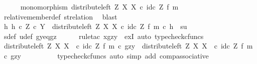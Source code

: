 \begin{isabellebody}
\ \ \ \ \isamarkupfalse%
\ {\isachardoublequoteopen}monomorphism\ {\isacharparenleft}{\kern0pt}distribute{\isacharunderscore}{\kern0pt}left\ Z\ X\ X\ {\isasymcirc}\isactrlsub c\ id\isactrlsub c\ Z\ {\isasymtimes}\isactrlsub f\ m{\isacharparenright}{\kern0pt}{\isachardoublequoteclose}\isanewline
\ \ \ \ \ \ \isamarkupfalse%
\ relative{\isacharunderscore}{\kern0pt}member{\isacharunderscore}{\kern0pt}def{}\ st{\isacharunderscore}{\kern0pt}relation\ \isamarkupfalse%
\ blast\isanewline
\ \ \ \ \isamarkupfalse%
\ {\isachardoublequoteopen}{\isasymexists}h{\isachardot}{\kern0pt}\ h\ {\isasymin}\isactrlsub c\ Z\ {\isasymtimes}\isactrlsub c\ Y\ {\isasymand}\ {\isacharparenleft}{\kern0pt}distribute{\isacharunderscore}{\kern0pt}left\ Z\ X\ X\ {\isasymcirc}\isactrlsub c\ id\isactrlsub c\ Z\ {\isasymtimes}\isactrlsub f\ m{\isacharparenright}{\kern0pt}\ {\isasymcirc}\isactrlsub c\ h\ {\isacharequal}{\kern0pt}\ {\isasymlangle}s{\isacharcomma}{\kern0pt}u{\isasymrangle}{\isachardoublequoteclose}\isanewline
\ \ \ \ \ \ \isamarkupfalse%
\ s{\isacharunderscore}{\kern0pt}def\ u{\isacharunderscore}{\kern0pt}def\ gy{\isacharunderscore}{\kern0pt}eq{\isacharunderscore}{\kern0pt}gz\isanewline
\ \ \ \ \isamarkupfalse%
\ {\isacharparenleft}{\kern0pt}rule{\isacharunderscore}{\kern0pt}tac\ x{\isacharequal}{\kern0pt}{\isachardoublequoteopen}{\isasymlangle}gz{\isacharcomma}{\kern0pt}y{\isasymrangle}{\isachardoublequoteclose}\ \ exI{\isacharcomma}{\kern0pt}\ auto{\isacharcomma}{\kern0pt}\ typecheck{\isacharunderscore}{\kern0pt}cfuncs{\isacharparenright}{\kern0pt}\isanewline
\ \ \ \ \ \ \isamarkupfalse%
\ {\isachardoublequoteopen}{\isacharparenleft}{\kern0pt}distribute{\isacharunderscore}{\kern0pt}left\ Z\ X\ X\ \ {\isasymcirc}\isactrlsub c\ {\isacharparenleft}{\kern0pt}id\isactrlsub c\ Z\ {\isasymtimes}\isactrlsub f\ m{\isacharparenright}{\kern0pt}{\isacharparenright}{\kern0pt}\ {\isasymcirc}\isactrlsub c\ {\isasymlangle}gz{\isacharcomma}{\kern0pt}y{\isasymrangle}\ {\isacharequal}{\kern0pt}\ distribute{\isacharunderscore}{\kern0pt}left\ Z\ X\ X\ \ {\isasymcirc}\isactrlsub c\ {\isacharparenleft}{\kern0pt}id\isactrlsub c\ Z\ {\isasymtimes}\isactrlsub f\ m{\isacharparenright}{\kern0pt}\ {\isasymcirc}\isactrlsub c\ {\isasymlangle}gz{\isacharcomma}{\kern0pt}y{\isasymrangle}{\isachardoublequoteclose}\isanewline
\ \ \ \ \ \ \ \ \isamarkupfalse%
\ {\isacharparenleft}{\kern0pt}typecheck{\isacharunderscore}{\kern0pt}cfuncs{\isacharcomma}{\kern0pt}\ auto\ simp\ add{\isacharcolon}{\kern0pt}\ comp{\isacharunderscore}{\kern0pt}associative{}{\isacharparenright}{\kern0pt}\isanewline

\end{isabellebody}
